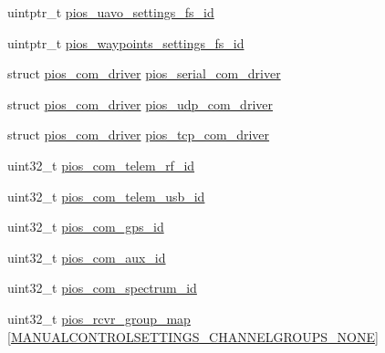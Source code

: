 \begin{DoxyCompactItemize}
\item 
uintptr\-\_\-t \hyperlink{group___revolution_gab060f441dd600b08386c0ca1b487217a}{pios\-\_\-uavo\-\_\-settings\-\_\-fs\-\_\-id}
\item 
uintptr\-\_\-t \hyperlink{group___revolution_ga4b04979e5fb31eaa66088178605835cd}{pios\-\_\-waypoints\-\_\-settings\-\_\-fs\-\_\-id}
\item 
struct \hyperlink{structpios__com__driver}{pios\-\_\-com\-\_\-driver} \hyperlink{group___revolution_gac2e4f2b1a482c1480ae2639bfb241e0f}{pios\-\_\-serial\-\_\-com\-\_\-driver}
\item 
struct \hyperlink{structpios__com__driver}{pios\-\_\-com\-\_\-driver} \hyperlink{group___revolution_ga58da5534fd5007351a8ed77275aa8ad2}{pios\-\_\-udp\-\_\-com\-\_\-driver}
\item 
struct \hyperlink{structpios__com__driver}{pios\-\_\-com\-\_\-driver} \hyperlink{group___revolution_gae22d8a8963cc7f41d351eca5d6ec835a}{pios\-\_\-tcp\-\_\-com\-\_\-driver}
\item 
uint32\-\_\-t \hyperlink{group___revolution_ga81f6bbc74499d8041b498fd84393191e}{pios\-\_\-com\-\_\-telem\-\_\-rf\-\_\-id}
\item 
uint32\-\_\-t \hyperlink{group___revolution_ga1ec5827cb1b86c4db093bbd681d6960e}{pios\-\_\-com\-\_\-telem\-\_\-usb\-\_\-id}
\item 
uint32\-\_\-t \hyperlink{group___revolution_gaaf87638a9e94d36dff49d099d8f82d62}{pios\-\_\-com\-\_\-gps\-\_\-id}
\item 
uint32\-\_\-t \hyperlink{group___revolution_gaa160f7822e620030169c8ac05eee2c36}{pios\-\_\-com\-\_\-aux\-\_\-id}
\item 
uint32\-\_\-t \hyperlink{group___revolution_gaec1ba37a7abfd74ce0bc4b9a610269c9}{pios\-\_\-com\-\_\-spectrum\-\_\-id}
\item 
uint32\-\_\-t \hyperlink{group___revolution_ga6c6cfc16eb738e47c123298e062297e2}{pios\-\_\-rcvr\-\_\-group\-\_\-map} \mbox{[}\hyperlink{group___manual_control_settings_gga94e1fe696fef2f85cbdb4a2e479c7ed2af9104b4e2c50328b0912db1e10fc3074}{\-M\-A\-N\-U\-A\-L\-C\-O\-N\-T\-R\-O\-L\-S\-E\-T\-T\-I\-N\-G\-S\-\_\-\-C\-H\-A\-N\-N\-E\-L\-G\-R\-O\-U\-P\-S\-\_\-\-N\-O\-N\-E}\mbox{]}
\end{DoxyCompactItemize}


